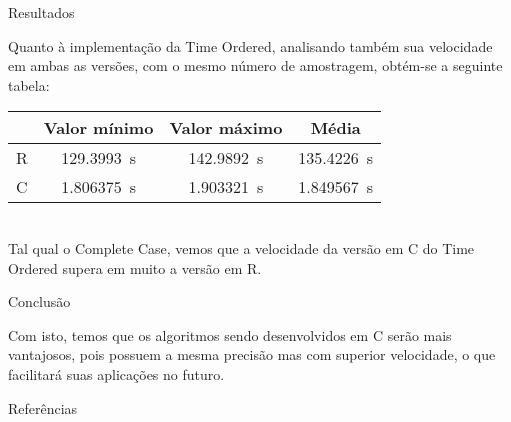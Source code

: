 \documentclass{beamer} %
\begin{document}
\begin{frame}{Resultados}
    
Quanto à implementação da Time Ordered, analisando também sua velocidade em ambas as versões, com o mesmo número de amostragem, obtém-se a seguinte tabela:\\

\vspace{0.3cm}
\begin{tabular}{|c|c|c|c|}
     \hline
      & Valor mínimo & Valor máximo & Média\\
      \hline
      R & \SI{129.3993}{\second} & \SI{142.9892}{\second} & \SI{135.4226}{\second}\\
      \hline
      C & \SI{1.806375}{\second} & \SI{1.903321}{\second} & \SI{1.849567}{\second}\\
      \hline
\end{tabular}\\
\vspace{0.3cm}
Tal qual o Complete Case, vemos que a velocidade da versão em C do Time Ordered supera em muito a versão em R.
    
\end{frame}

\begin{frame}{Conclusão}
    
Com isto, temos que os algoritmos sendo desenvolvidos em C serão mais vantajosos, pois possuem a mesma precisão mas com superior velocidade, o que facilitará suas aplicações no futuro.

\end{frame}

\begin{frame}{Referências}
    
    \tiny
\end{frame}
\end{document}
